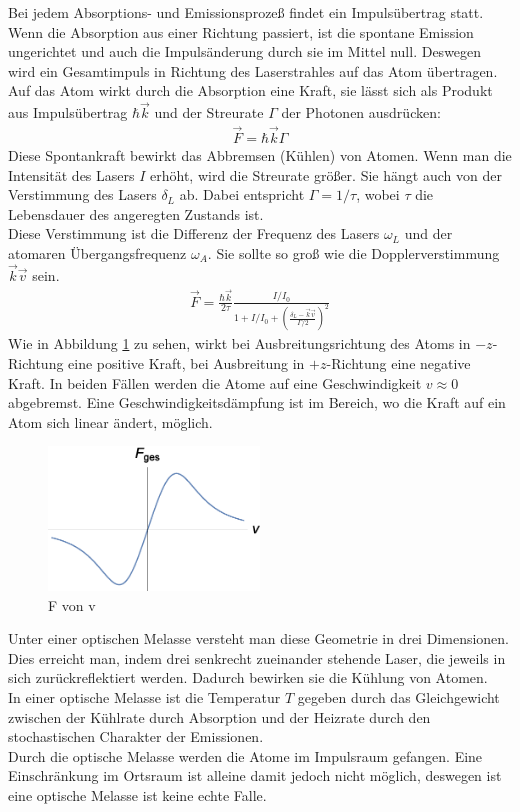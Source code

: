 \documentclass[12pt, a4paper]{article}
\begin{document}
  Bei jedem Absorptions- und Emissionsprozeß findet ein Impulsübertrag statt. Wenn die Absorption aus einer Richtung passiert, ist die spontane Emission ungerichtet und auch die Impulsänderung durch sie im Mittel null. Deswegen wird ein Gesamtimpuls in Richtung des Laserstrahles auf das Atom übertragen.
 \\Auf das Atom wirkt durch die Absorption eine Kraft, sie lässt sich als Produkt aus Impulsübertrag $\hbar\vec{k}$ und der Streurate $\Gamma$ der Photonen ausdrücken: 
   \begin{align*}
  \vec F=\hbar \vec k \Gamma
  \end{align*}
  Diese Spontankraft bewirkt das Abbremsen (Kühlen) von Atomen. Wenn man die Intensität des Lasers ${I}$ erhöht, wird die Streurate größer. Sie hängt auch von der Verstimmung des Lasers ${\delta_L}$ ab. Dabei entspricht ${\Gamma =1/ \tau}$, wobei ${\tau}$ die Lebensdauer des angeregten Zustands ist.
  \\Diese Verstimmung ist die Differenz der Frequenz des Lasers ${\omega_L}$ und der atomaren Übergangsfrequenz ${\omega_A}$. Sie sollte so groß wie die Dopplerverstimmung ${\vec k \vec v}$ sein.
   \begin{align*}
    \vec F=\frac{\hbar \vec k}{2 \tau} \frac{I/I_0}{1+I/I_0+(\frac{ \delta _L-\vec k \vec v}{\Gamma /2})^2}
  \end{align*}
  Wie in Abbildung \ref{fvonv} zu sehen, wirkt bei Ausbreitungsrichtung des Atoms in $-z$-Richtung eine positive Kraft, bei Ausbreitung in $+z$-Richtung eine negative Kraft. In beiden Fällen werden die Atome auf eine Geschwindigkeit ${v\approx 0}$ abgebremst. Eine Geschwindigkeitsdämpfung ist im Bereich, wo die Kraft auf ein Atom sich linear ändert, möglich.
   \begin{figure}[h!]
  \centering
  \includegraphics[width=0.5\textwidth]{fvonv.eps}
  \caption{F von v}
  \label{fvonv}
  \end{figure}
  \newpage
  Unter einer optischen Melasse versteht man diese Geometrie in drei Dimensionen. Dies erreicht man, indem drei senkrecht zueinander stehende Laser, die jeweils in sich zurückreflektiert werden. Dadurch bewirken sie die Kühlung von Atomen.
 \\In einer optische Melasse ist die Temperatur ${T}$ gegeben durch das Gleichgewicht zwischen der Kühlrate durch Absorption und der Heizrate durch den stochastischen Charakter der Emissionen.
 \\Durch die optische Melasse werden die Atome im Impulsraum gefangen. Eine Einschränkung im Ortsraum ist alleine damit jedoch nicht möglich, deswegen ist eine optische Melasse ist keine echte Falle.
 
\end{document}
